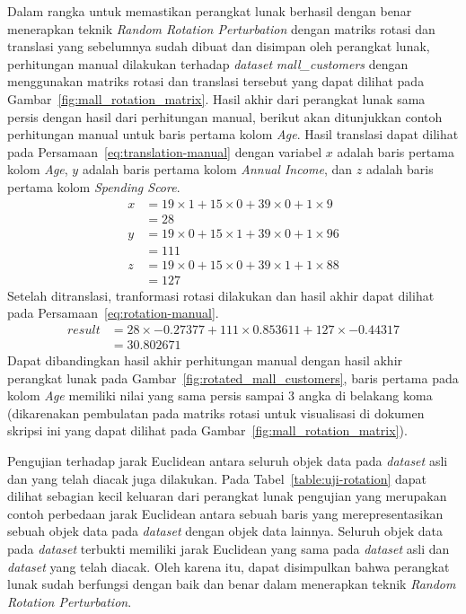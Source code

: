 Dalam rangka untuk memastikan perangkat lunak berhasil dengan benar menerapkan teknik \textit{Random Rotation Perturbation} dengan matriks rotasi dan translasi yang sebelumnya sudah dibuat dan disimpan oleh perangkat lunak, perhitungan manual dilakukan terhadap \textit{dataset} \textit{mall\_customers} dengan menggunakan matriks rotasi dan translasi tersebut yang dapat dilihat pada Gambar~\ref{fig:mall_rotation_matrix}. Hasil akhir dari perangkat lunak sama persis dengan hasil dari perhitungan manual, berikut akan ditunjukkan contoh perhitungan manual untuk baris pertama kolom \textit{Age}. Hasil translasi dapat dilihat pada Persamaan~\ref{eq:translation-manual} dengan variabel \(x\) adalah baris pertama kolom \textit{Age}, \(y\) adalah baris pertama kolom \textit{Annual Income}, dan \(z\) adalah baris pertama kolom \textit{Spending Score}. 
\begin{align}
	x &= 19\times1+15\times0+39\times0+1\times9 \label{eq:translation-manual}\\
	&= 28 \nonumber\\
	y &= 19\times0+15\times1+39\times0+1\times96 \nonumber\\
	&= 111 \nonumber\\
	z &= 19\times0+15\times0+39\times1+1\times88 \nonumber\\
	&= 127 \nonumber
\end{align}
Setelah ditranslasi, tranformasi rotasi dilakukan dan hasil akhir dapat dilihat pada Persamaan~\ref{eq:rotation-manual}. 
\begin{align}
	result &= 28\times-0.27377 + 111\times0.853611 + 127\times-0.44317 \label{eq:rotation-manual} \\
	&= 30.802671 \nonumber
\end{align}
Dapat dibandingkan hasil akhir perhitungan manual dengan hasil akhir perangkat lunak pada Gambar~\ref{fig:rotated_mall_customers}, baris pertama pada kolom \textit{Age} memiliki nilai yang sama persis sampai 3 angka di belakang koma (dikarenakan pembulatan pada matriks rotasi untuk visualisasi di dokumen skripsi ini yang dapat dilihat pada Gambar~\ref{fig:mall_rotation_matrix}).

Pengujian terhadap jarak Euclidean antara seluruh objek data pada \textit{dataset} asli dan yang telah diacak juga dilakukan. Pada Tabel~\ref{table:uji-rotation} dapat dilihat sebagian kecil keluaran dari perangkat lunak pengujian yang merupakan contoh perbedaan jarak Euclidean antara sebuah baris yang merepresentasikan sebuah objek data pada \textit{dataset} dengan objek data lainnya. Seluruh objek data pada \textit{dataset} terbukti memiliki jarak Euclidean yang sama pada \textit{dataset} asli dan \textit{dataset} yang telah diacak. Oleh karena itu, dapat disimpulkan bahwa perangkat lunak sudah berfungsi dengan baik dan benar dalam menerapkan teknik \textit{Random Rotation Perturbation}.


